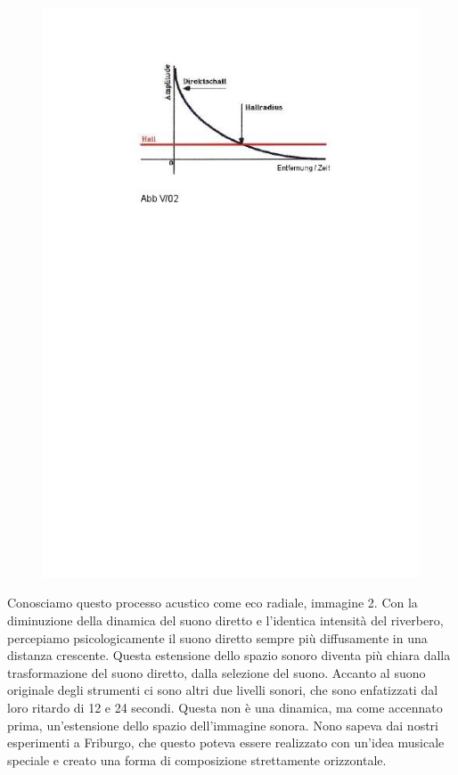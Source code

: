 \begin{figure}[htbp]
\begin{center}
\includegraphics[width=1\textwidth]{images/nono/hph/ab_v_02.jpg}
\caption{}
\label{hph-img2}
\end{center}
\end{figure}

Conosciamo questo processo acustico come eco radiale, immagine 2. Con la diminuzione della dinamica del suono diretto e l'identica intensità del riverbero, percepiamo psicologicamente il suono diretto sempre più diffusamente in una distanza crescente. Questa estensione dello spazio sonoro diventa più chiara dalla trasformazione del suono diretto, dalla selezione del suono. Accanto al suono originale degli strumenti ci sono altri due livelli sonori, che sono enfatizzati dal loro ritardo di 12 e 24 secondi. Questa non è una dinamica, ma come accennato prima, un'estensione dello spazio dell'immagine sonora. 
Nono sapeva dai nostri esperimenti a Friburgo, che questo poteva essere realizzato con un'idea musicale speciale e creato una forma di composizione strettamente orizzontale. 

